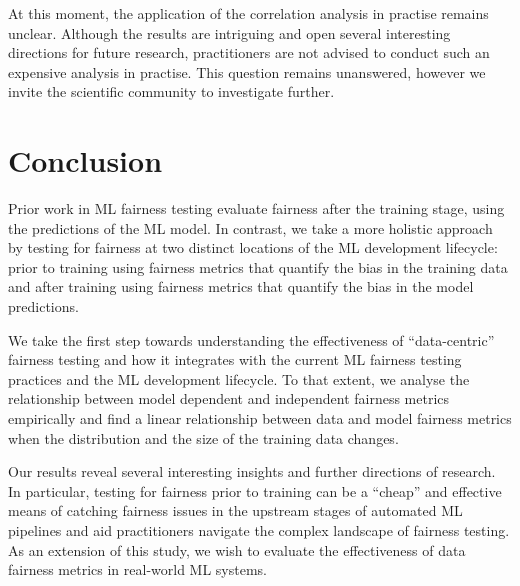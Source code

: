 \documentclass[conference,review,anonymous]{IEEEtran}
\begin{document}

At this moment, the application of the correlation analysis in
practise remains unclear. Although the results are intriguing and open
several interesting directions for future research, practitioners are
not advised to conduct such an expensive analysis in practise. This
question remains unanswered, however we invite the scientific
community to investigate further.


\section{Conclusion}\label{sec:conclude}

Prior work in ML fairness testing evaluate fairness after the training
stage, using the predictions of the ML model. In contrast, we take a
more holistic approach by testing for fairness at two distinct
locations of the ML development lifecycle: prior to training using
fairness metrics that quantify the bias in the training data and after
training using fairness metrics that quantify the bias in the model
predictions.


We take the first step towards understanding the effectiveness of
``data-centric'' fairness testing and how it integrates with the
current ML fairness testing practices and the ML development
lifecycle. To that extent, we analyse the relationship between model
dependent and independent fairness metrics empirically and find a
linear relationship between data and model fairness metrics when the
distribution and the size of the training data changes.

Our results reveal several interesting insights and further directions
of research. In particular, testing for fairness prior to training can
be a ``cheap'' and effective means of catching fairness issues in the
upstream stages of automated ML pipelines and aid practitioners
navigate the complex landscape of fairness testing. As an extension of
this study, we wish to evaluate the effectiveness of data fairness
metrics in real-world ML systems.



\end{document}
